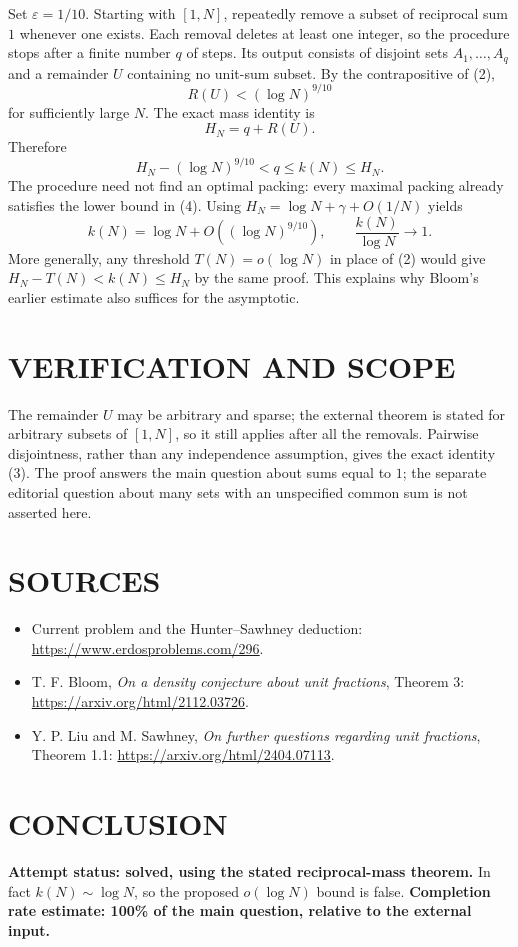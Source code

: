 Set $\varepsilon=1/10$. Starting with $[1,N]$, repeatedly remove a subset of reciprocal sum $1$ whenever one exists. Each removal deletes at least one integer, so the procedure stops after a finite number $q$ of steps. Its output consists of disjoint sets $A_1,\ldots,A_q$ and a remainder $U$ containing no unit-sum subset. By the contrapositive of (2),
\[
R(U)<(\log N)^{9/10}
\]
for sufficiently large $N$. The exact mass identity is
\[
H_N=q+R(U).
\tag{3}
\]
Therefore
\[
H_N-(\log N)^{9/10}<q\leq k(N)\leq H_N.
\tag{4}
\]
The procedure need not find an optimal packing: every maximal packing already satisfies the lower bound in (4). Using $H_N=\log N+\gamma+O(1/N)$ yields
\[
k(N)=\log N+O((\log N)^{9/10}),\qquad
\frac{k(N)}{\log N}\longrightarrow1.
\tag{5}
\]
More generally, any threshold $T(N)=o(\log N)$ in place of (2) would give $H_N-T(N)<k(N)\leq H_N$ by the same proof. This explains why Bloom's earlier estimate also suffices for the asymptotic.

\section{VERIFICATION AND SCOPE}
The remainder $U$ may be arbitrary and sparse; the external theorem is stated for arbitrary subsets of $[1,N]$, so it still applies after all the removals. Pairwise disjointness, rather than any independence assumption, gives the exact identity (3). The proof answers the main question about sums equal to $1$; the separate editorial question about many sets with an unspecified common sum is not asserted here.

\section{SOURCES}
\begin{itemize}
\item Current problem and the Hunter--Sawhney deduction: \url{https://www.erdosproblems.com/296}.
\item T. F. Bloom, \emph{On a density conjecture about unit fractions}, Theorem 3: \url{https://arxiv.org/html/2112.03726}.
\item Y. P. Liu and M. Sawhney, \emph{On further questions regarding unit fractions}, Theorem 1.1: \url{https://arxiv.org/html/2404.07113}.
\end{itemize}
\section{CONCLUSION}
\textbf{Attempt status: solved, using the stated reciprocal-mass theorem.}
In fact $k(N)\sim\log N$, so the proposed $o(\log N)$ bound is false.
\textbf{Completion rate estimate: 100\% of the main question, relative to the external input.}
